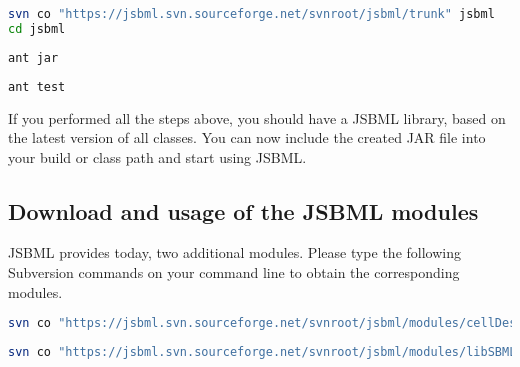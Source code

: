 \begin{lstlisting}[language=bash,numbers=none,captionpos=t,
title={Use the following command to download the latest JSBML classes (requires
Subversion\footref{fn:svn}):}]
svn co "https://jsbml.svn.sourceforge.net/svnroot/jsbml/trunk" jsbml
cd jsbml
\end{lstlisting}

\begin{lstlisting}[language=bash,numbers=none,captionpos=t,
title={To compile the JSBML library to a single JAR file, type the following
command (requires Apache Ant\footref{fn:ant}):}]
ant jar
\end{lstlisting}

\begin{lstlisting}[language=bash,numbers=none,captionpos=t,
title={If you want to run the JUnit tests on your compiled JAR file, please use
the following command:}]
ant test
\end{lstlisting}

If you performed all the steps above, you should have a JSBML library, based on
the latest version of all classes. You can now include the created JAR file into
your build or class path and start using JSBML.

\subsection{Download and usage of the JSBML modules}

JSBML provides today, two additional modules. Please type the following
Subversion commands on your command line to obtain the
corresponding modules.


\begin{lstlisting}[language=bash,numbers=none,captionpos=t,
title={The CellDesigner bridge-module should help CellDesigner plugin developers
to use JSBML as internal datastructure.}]
svn co "https://jsbml.svn.sourceforge.net/svnroot/jsbml/modules/cellDesigner" cellDesigner
\end{lstlisting}

\begin{lstlisting}[language=bash,numbers=none,captionpos=t,
title={Developers, who still want to make use of libSBML, might want to have a look 
at the libSBML communication layer.}] 
svn co "https://jsbml.svn.sourceforge.net/svnroot/jsbml/modules/libSBMLio/" libSBMLio
\end{lstlisting}


